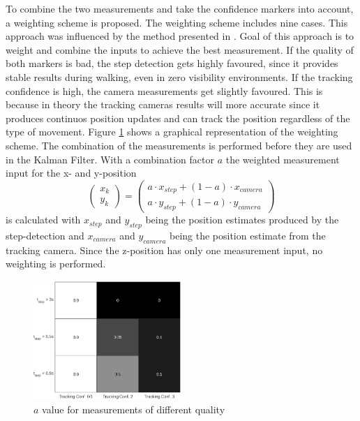 \documentclass[engproc,conferenceproceedings,submit,pdftex,moreauthors]{Definitions/mdpi}
\begin{document}
To combine the two measurements and take the confidence markers into account, a weighting scheme is proposed. The weighting scheme includes nine cases. This approach was influenced by the method presented in \cite{caron2006}. Goal of this approach is to weight and combine the inputs to achieve the best measurement.  If the quality of both markers is bad, the step detection gets highly favoured, since it provides stable results during walking, even in zero visibility environments. If the tracking confidence is high, the camera measurements get slightly favoured. This is because in theory the tracking cameras results will more accurate since it produces continuos position updates and can track the position regardless of the type of movement. Figure \ref{fig:confidence} shows a graphical representation of the weighting scheme. The combination of the measurements is performed before they are used in the Kalman Filter. With a combination factor  $a$ the weighted measurement input for the x- and y-position
\begin{equation}
	\begin{pmatrix}
		x_k\\
		y_k
	\end{pmatrix} =
	\begin{pmatrix}
		a\cdot x_{step} + (1-a)\cdot x_{camera}\\
		a\cdot y_{step} + (1-a)\cdot y_{camera}
	\end{pmatrix}
\end{equation}  
is calculated with $x_{step}$ and $y_{step}$ being the position estimates produced by the step-detection and $x_{camera}$ and $y_{camera}$ being the position estimate from the tracking camera. Since the z-position has only one measurement input, no weighting is performed.
\begin{figure}[h!]
	\centering
	\includegraphics[width=0.5\textwidth]{measurementQuality.eps}
	\caption{$a$ value for measurements of different quality}
	\label{fig:confidence}
	
\end{figure}
\end{document}
